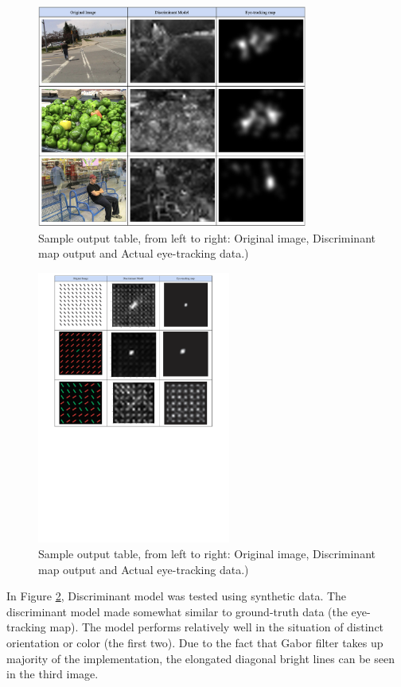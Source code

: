 \documentclass[conference]{IEEEtran}
\begin{document}
\begin{figure}[h]
    \centering
    \includegraphics[width=3.5in]{outputs.png}
    \caption{Sample output table, from left to right: Original image, Discriminant map output and Actual eye-tracking data.) }
    \label{fig:outputs1}
\end{figure}

\begin{figure}[h]
    \centering
    \includegraphics[trim={180 500 180 20},width=2.5in]{outputs2.pdf}
    \caption{Sample output table, from left to right: Original image, Discriminant map output and Actual eye-tracking data.) }
    \label{fig:outputs2}
\end{figure}

In Figure \ref{fig:outputs2}, Discriminant model was tested using synthetic data. The discriminant model made somewhat similar to ground-truth data (the eye-tracking map). The model performs relatively well in the situation of distinct orientation or color (the first two). Due to the fact that Gabor filter takes up majority of the implementation, the elongated diagonal bright lines can be seen in the third image. 
\end{document}
